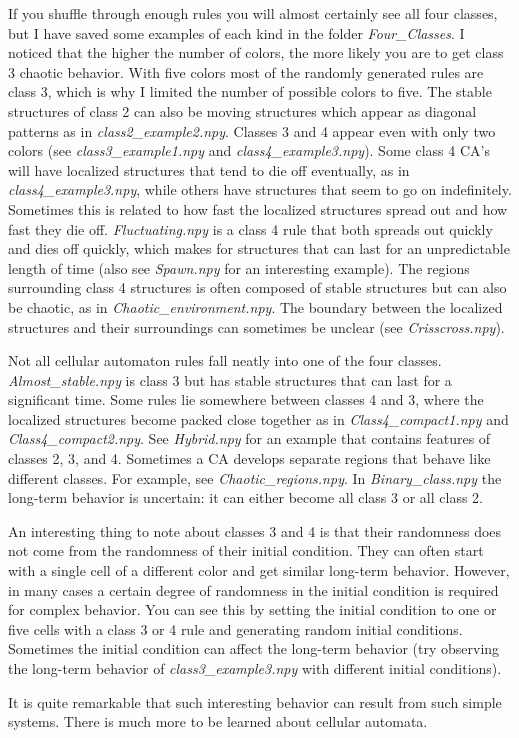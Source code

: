 \documentclass[12pt]{article}
\begin{document}
If you shuffle through enough rules you will almost certainly see all four classes, but I have saved some examples of each kind in the folder \textit{Four\_Classes}.
I noticed that the higher the number of colors, the more likely you are to get class 3 chaotic behavior.
With five colors most of the randomly generated rules are class 3, which is why I limited the number of possible colors to five.
The stable structures of class 2 can also be moving structures which appear as diagonal patterns as in \textit{class2\_example2.npy}.
Classes 3 and 4 appear even with only two colors (see \textit{class3\_example1.npy} and \textit{class4\_example3.npy}).
Some class 4 CA's will have localized structures that tend to die off eventually, as in \textit{class4\_example3.npy}, while others have structures that seem to go on indefinitely.
Sometimes this is related to how fast the localized structures spread out and how fast they die off.
\textit{Fluctuating.npy} is a class 4 rule that both spreads out quickly and dies off quickly, which makes for structures that can last for an unpredictable length of time (also see \textit{Spawn.npy} for an interesting example).
The regions surrounding class 4 structures is often composed of stable structures but can also be chaotic, as in \textit{Chaotic\_environment.npy}.
The boundary between the localized structures and their surroundings can sometimes be unclear (see \textit{Crisscross.npy}).

Not all cellular automaton rules fall neatly into one of the four classes.
\textit{Almost\_stable.npy} is class 3 but has stable structures that can last for a significant time.
Some rules lie somewhere between classes 4 and 3, where the localized structures become packed close together as in  \textit{Class4\_compact1.npy} and \textit{Class4\_compact2.npy}.
See \textit{Hybrid.npy} for an example that contains features of classes 2, 3, and 4.
Sometimes a CA develops separate regions that behave like different classes.
For example, see \textit{Chaotic\_regions.npy}.
In \textit{Binary\_class.npy} the long-term behavior is uncertain:  it can either become all class 3 or all class 2.

An interesting thing to note about classes 3 and 4 is that their randomness does not come from the randomness of their initial condition.
They can often start with a single cell of a different color and get similar long-term behavior.
However, in many cases a certain degree of randomness in the initial condition is required for complex behavior.
You can see this by setting the initial condition to one or five cells with a class 3 or 4 rule and generating random initial conditions.
Sometimes the initial condition can affect the long-term behavior (try observing the long-term behavior of \textit{class3\_example3.npy} with different initial conditions).

It is quite remarkable that such interesting behavior can result from such simple systems.  There is much more to be learned about cellular automata.
\end{document}
